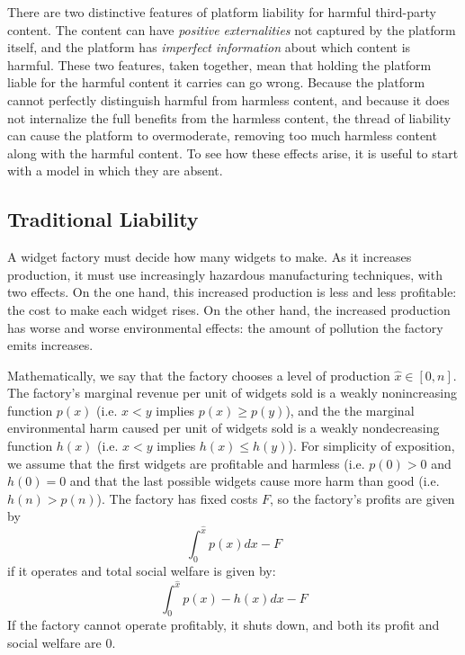 

There are two distinctive features of platform liability for harmful third-party content. The content can have \emph{positive externalities} not captured by the platform itself, and the platform has \emph{imperfect information} about which content is harmful. These two features, taken together, mean that holding the platform liable for the harmful content it carries can go wrong. Because the 
platform cannot perfectly distinguish harmful from harmless content, and because it does not internalize the full benefits from the harmless content, the thread of liability can cause the platform to overmoderate, removing too much harmless content along with the harmful content. To see how these effects arise, it is useful to start with a model in which they are absent.


\subsection{Traditional Liability}

A widget factory must decide how many widgets to make. As it increases production, it must use increasingly hazardous manufacturing techniques, with two effects.  On the one hand, this increased production is less and less profitable: the cost to make each widget rises. On the other hand, the increased production has worse and worse environmental effects: the amount of pollution the factory emits increases.

Mathematically, we say that the factory chooses a level of production $\hat{x} \in [0,n]$. The factory's marginal revenue per unit of widgets sold is a weakly nonincreasing function $p(x)$ (i.e. $x < y$ implies $p(x) \ge p(y)$), and the the marginal environmental harm caused per unit of widgets sold is a weakly nondecreasing function $h(x)$ (i.e. $x < y$ implies $h(x) \le h(y)$). For simplicity of exposition, we assume that the first widgets are profitable and harmless (i.e. $p(0) > 0$ and $h(0) = 0$ and that the last possible widgets cause more harm than good (i.e. $h(n) > p(n)$).  The factory has fixed costs $F$, so the factory's profits are given by 
\begin{equation}
\int_{0}^{\hat{x}} p(x) dx - F
\end{equation}
if it operates and total social welfare is given by:
\begin{equation}
\int_{0}^{\hat{x}} p(x) - h(x) dx - F
\end{equation}
If the factory cannot operate profitably, it shuts down, and both its profit and social welfare are $0$.

